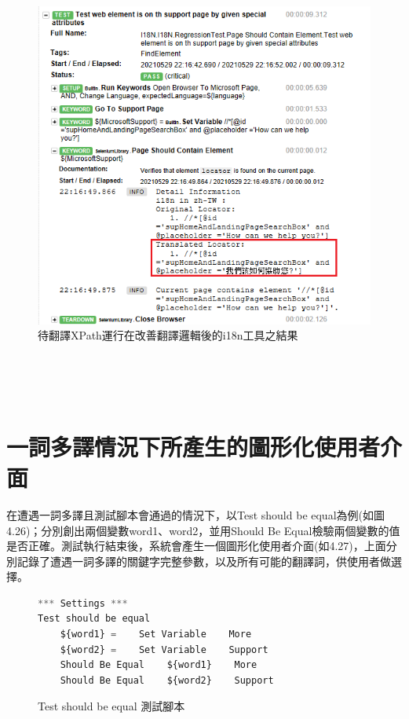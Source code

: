 \begin{figure}[H]
\centering
\includegraphics[width= \textwidth]{../論文截圖/4-2-4 @placeholder運行在當前i18n版本.png}
\caption{待翻譯XPath運行在改善翻譯邏輯後的i18n工具之結果}
\label{待翻譯XPath運行在改善翻譯邏輯後的i18n工具之結果}
\end{figure}

\hspace*{\fill} \\
\\ \hspace*{\fill} \\
\section{一詞多譯情況下所產生的圖形化使用者介面}
在遭遇一詞多譯且測試腳本會通過的情況下，以Test should be equal為例(如圖4.26)；分別創出兩個變數word1、word2，並用Should Be Equal檢驗兩個變數的值是否正確。測試執行結束後，系統會產生一個圖形化使用者介面(如4.27)，上面分別記錄了遭遇一詞多譯的關鍵字完整參數，以及所有可能的翻譯詞，供使用者做選擇。\\

\begin{figure}[H]
\begin{lstlisting}[language={python}]
*** Settings ***
Test should be equal
    ${word1} =    Set Variable    More
    ${word2} =    Set Variable    Support
    Should Be Equal    ${word1}    More
    Should Be Equal    ${word2}    Support
\end{lstlisting}
\caption{Test should be equal 測試腳本}
\end{figure}

